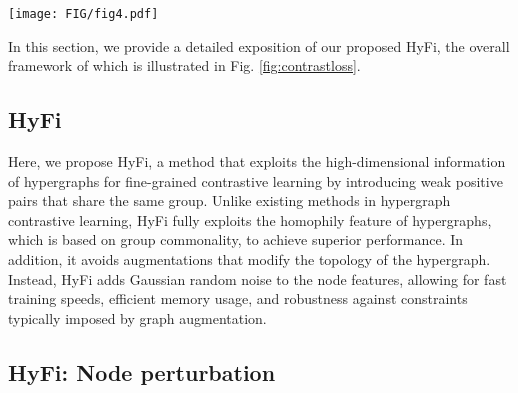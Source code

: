 \begin{figure*}[t!]
  \centering
  \texttt{[image: FIG/fig4.pdf]}
  \caption{Illustration of the node-level contrastive loss calculation process in HyFi. HyFi uses both the origin view and the noise view to calculate contrastive loss. In the origin view, there is a negative and a weak positive pair, and in the noise view there is a positive pair, which is a node in the same position as the anchor node.}
  \label{fig:contrastloss}
\end{figure*}

In this section, we provide a detailed exposition of our proposed HyFi, the overall framework of which is illustrated in Fig. \ref{fig:contrastloss}.


\subsection{HyFi}

Here, we propose HyFi, a method that exploits the high-dimensional information of hypergraphs for fine-grained contrastive learning by introducing weak positive pairs that share the same group. Unlike existing methods in hypergraph contrastive learning, HyFi fully exploits the homophily feature of hypergraphs, which is based on group commonality, to achieve superior performance. In addition, it avoids augmentations that modify the topology of the hypergraph. Instead, HyFi adds Gaussian random noise to the node features, allowing for fast training speeds, efficient memory usage, and robustness against constraints typically imposed by graph augmentation.




\subsection{HyFi: Node perturbation}

